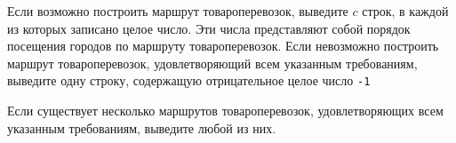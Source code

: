 Если возможно построить маршрут товароперевозок, выведите $c$ строк, в каждой из которых записано целое число. Эти числа представляют собой порядок посещения городов по маршруту
товароперевозок. Если невозможно построить маршрут товароперевозок, удовлетворяющий всем указанным требованиям, выведите одну строку, содержащую отрицательное целое число \texttt{-1}

 Если существует несколько маршрутов товароперевозок, удовлетворяющих
всем указанным требованиям, выведите любой из них.
